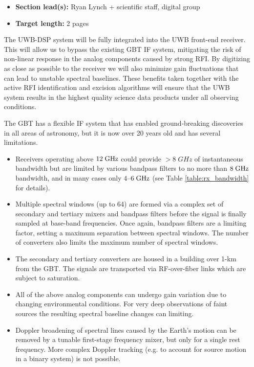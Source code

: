 \documentclass[10pt]{myNSF}
\begin{document}
\begin{itemize}
\item{\textbf{Section lead(s):} Ryan Lynch + scientific staff, digital
    group}
\item{\textbf{Target length:} 2 pages}
\end{itemize}


The UWB-DSP system will be fully integrated into the UWB front-end
receiver.  This will allow us to bypass the existing GBT IF system,
mitigating the risk of non-linear response in the analog components
caused by strong RFI.  By digitizing as close as possible to the
receiver we will also minimize gain fluctuations that can lead to
unstable spectral baselines.  These benefits taken together with the
active RFI identification and excision algorithms will ensure that the
UWB system results in the highest quality science data products under
all observing conditions.


The GBT has a flexible IF system that has enabled ground-breaking
discoveries in all areas of astronomy, but it is now over 20 years old
and has several limitations.
\begin{itemize}
  \item{Receivers operating above $12\; \textrm{GHz}$ could provide $>8\; GHz$
    of instantaneous bandwidth but are limited by various bandpass
    filters to no more than $8\; \textrm{GHz}$ bandwidth, and in many cases
    only $4$--$6\; \textrm{GHz}$ (see Table \ref{table:rx_bandwidth} for
    details).}
  \item{Multiple spectral windows (up to 64) are formed via a complex
    set of secondary and tertiary mixers and bandpass filters before
    the signal is finally sampled at base-band frequencies.  Once
    again, bandpass filters are a limiting factor, setting a maximum
    separation between spectral windows.  The number of converters
    also limits the maximum number of spectral windows.}
  \item{The secondary and tertiary converters are housed in a building
    over 1-km from the GBT.  The signals are transported via
    RF-over-fiber links which are subject to saturation.}
  \item{All of the above analog components can undergo gain variation
    due to changing environmental conditions.  For very deep
    observations of faint sources the resulting spectral baseline
    changes can limiting.}
  \item{Doppler broadening of spectral lines caused by the Earth's
    motion can be removed by a tunable first-stage frequency mixer,
    but only for a single rest frequency.  More complex Doppler
    tracking (e.g. to account for source motion in a binary system) is
    not possible.}
\end{itemize}
\end{document}
